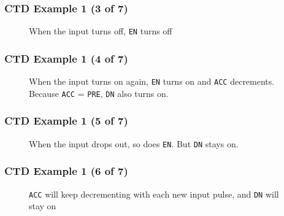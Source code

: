 \begin{frame}
    \frametitle{CTD Example 1 (3 of 7)}

    \begin{figure}
        \centering
        \resizebox{0.875\linewidth}{!}{
            
        }

        \vspace{0.5em}
        {\footnotesize When the input turns off, \texttt{EN} turns off\par}
    \end{figure}
\end{frame}

\begin{frame}
    \frametitle{CTD Example 1 (4 of 7)}

    \begin{figure}
        \centering
        \resizebox{0.875\linewidth}{!}{
            
        }

        \vspace{0.5em}
        {\footnotesize When the input turns on again, \texttt{EN} turns on and \texttt{ACC} decrements. Because \texttt{ACC} = \texttt{PRE}, \texttt{DN} also turns on.\par}
    \end{figure}
\end{frame}

\begin{frame}
    \frametitle{CTD Example 1 (5 of 7)}

    \begin{figure}
        \centering
        \resizebox{0.875\linewidth}{!}{
            
        }

        \vspace{0.5em}
        {\footnotesize When the input drops out, so does \texttt{EN}. But \texttt{DN} stays on.\par}
    \end{figure}
\end{frame}

\begin{frame}
    \frametitle{CTD Example 1 (6 of 7)}

    \begin{figure}
        \centering
        \resizebox{0.875\linewidth}{!}{
            
        }

        \vspace{0.5em}
        {\footnotesize \texttt{ACC} will keep decrementing with each new input pulse, and \texttt{DN} will stay on\par}
    \end{figure}
\end{frame}

